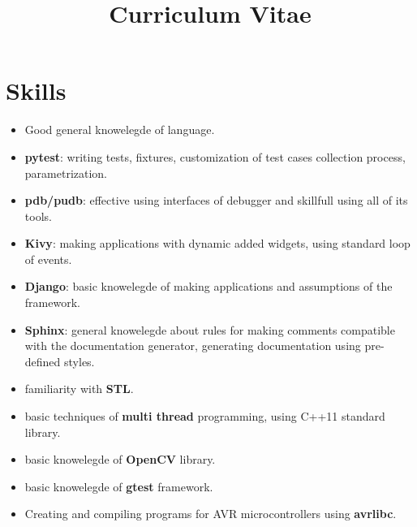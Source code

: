 \documentclass[11pt,a4paper,sans]{moderncv} %
\title{Curriculum Vitae}
\begin{document}
\makecvtitle %


\section{Skills}

 {
    \begin{itemize}
    \item Good general knowelegde of language.
    \item \textbf{pytest}: writing tests, fixtures, customization of test cases collection process, parametrization.
    \item \textbf{pdb/pudb}: effective using interfaces of debugger and skillfull using all of its tools.
    \item \textbf{Kivy}: making applications with dynamic added widgets, using standard loop of events.
    \item \textbf{Django}: basic knowelegde of making applications and assumptions of the framework.
    \item \textbf{Sphinx}: general knowelegde about rules for making comments compatible with the documentation generator, generating documentation using pre-defined styles.
    \end{itemize}
}
 {
    \begin{itemize}
    \item familiarity with \textbf{STL}.
    \item basic techniques of \textbf{multi thread} programming, using C++11 standard library.
    \item basic knowelegde of \textbf{OpenCV} library.
    \item basic knowelegde of \textbf{gtest} framework.
    \end{itemize}
}
 {\begin{itemize}
\item Creating and compiling programs for AVR microcontrollers using \textbf{avrlibc}.
\end{itemize}}
\end{document}
